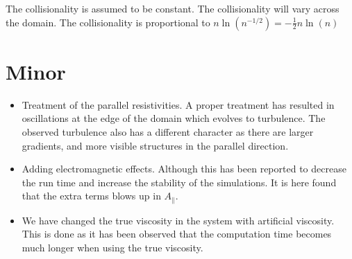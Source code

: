 The collisionality is assumed to be constant.
The collisionality will vary across the domain.
The collisionality is proportional to $n\ln(n^{-1/2})=-\frac{1}{2}n\ln(n)$

\section{Minor}

\begin{itemize}[noitemsep,nolistsep]
    \item Treatment of the parallel resistivities.
        A proper treatment has resulted in oscillations at the edge of the domain which evolves to turbulence.
        The observed turbulence also has a different character as there are larger gradients, and more visible structures in the parallel direction.
    \item Adding electromagnetic effects.
        Although this has been reported to decrease the run time and increase the stability of the simulations.
        It is here found that the extra terms blows up in $A_\|$.
    \item We have changed the true viscosity in the system with artificial viscosity.
        This is done as it has been observed that the computation time becomes much longer when using the true viscosity.
\end{itemize}
